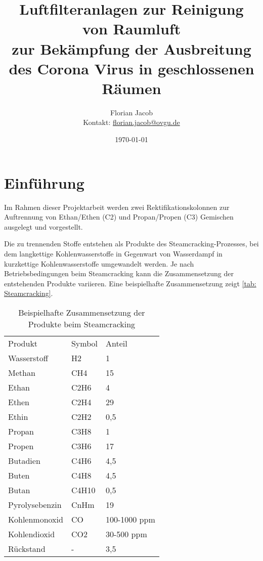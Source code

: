 \documentclass[12pt,a4paper,bibtotocnumbered,liststotocnumbered]{scrreprt}
\title{\textbf{Luftfilteranlagen zur Reinigung von Raumluft}\\zur Bekämpfung der Ausbreitung des Corona Virus in geschlossenen Räumen}
\author{Florian Jacob \\Kontakt: \url{florian.jacob@ovgu.de}}
\date{\today}
\begin{document}
\maketitle
\tableofcontents
\newpage
{}
\plain



\chapter{Einführung}

Im Rahmen dieser Projektarbeit werden zwei Rektifikationskolonnen zur Auftrennung von Ethan/Ethen (C2) und Propan/Propen (C3) Gemischen ausgelegt und vorgestellt.

Die zu trennenden Stoffe entstehen als Produkte des Steamcracking-Prozesses, bei dem langkettige Kohlenwasserstoffe in Gegenwart von Wasserdampf in kurzkettige Kohlenwasserstoffe umgewandelt werden. Je nach Betriebsbedingungen beim Steamcracking kann die Zusammensetzung der entstehenden Produkte variieren. Eine beispielhafte Zusammensetzung zeigt \autoref{tab: Steamcracking}.

\begin{table}[htbp]
  \centering
  \caption{Beispielhafte Zusammensetzung der Produkte beim Steamcracking}
    \begin{tabular}{lll}
    Produkt & Symbol & Anteil \\
    Wasserstoff & H2   & 1 \\
    Methan & CH4  & 15 \\
    Ethan & C2H6 & 4 \\
    Ethen & C2H4 & 29 \\
    Ethin & C2H2 & 0,5 \\
    Propan & C3H8 & 1 \\
    Propen & C3H6 & 17 \\
    Butadien & C4H6 & 4,5 \\
    Buten & C4H8 & 4,5 \\
    Butan & C4H10 & 0,5 \\
    Pyrolysebenzin & CnHm & 19 \\
    Kohlenmonoxid & CO   & 100-1000 ppm \\
    Kohlendioxid & CO2  & 30-500 ppm \\
    Rückstand & -    & 3,5 \\
    \end{tabular}%
  \label{tab: Steamcracking}%
\end{table}%
\end{document}
